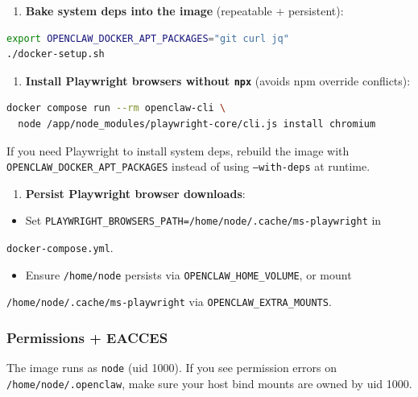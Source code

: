 \begin{enumerate}
  \item \textbf{Bake system deps into the image} (repeatable + persistent):
\end{enumerate}


\begin{lstlisting}[language=bash]
export OPENCLAW_DOCKER_APT_PACKAGES="git curl jq"
./docker-setup.sh
\end{lstlisting}


\begin{enumerate}
  \item \textbf{Install Playwright browsers without \texttt{npx}} (avoids npm override conflicts):
\end{enumerate}


\begin{lstlisting}[language=bash]
docker compose run --rm openclaw-cli \
  node /app/node_modules/playwright-core/cli.js install chromium
\end{lstlisting}


If you need Playwright to install system deps, rebuild the image with
\texttt{OPENCLAW\_DOCKER\_APT\_PACKAGES} instead of using \texttt{--with-deps} at runtime.

\begin{enumerate}
  \item \textbf{Persist Playwright browser downloads}:
\end{enumerate}


\begin{itemize}
  \item Set \texttt{PLAYWRIGHT\_BROWSERS\_PATH=/home/node/.cache/ms-playwright} in
\end{itemize}

\texttt{docker-compose.yml}.
\begin{itemize}
  \item Ensure \texttt{/home/node} persists via \texttt{OPENCLAW\_HOME\_VOLUME}, or mount
\end{itemize}

\texttt{/home/node/.cache/ms-playwright} via \texttt{OPENCLAW\_EXTRA\_MOUNTS}.

\subsubsection{Permissions + EACCES}


The image runs as \texttt{node} (uid 1000). If you see permission errors on
\texttt{/home/node/.openclaw}, make sure your host bind mounts are owned by uid 1000.

